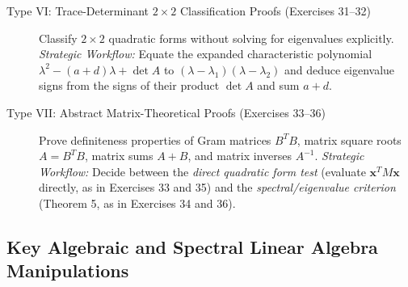 \documentclass[11pt, letterpaper]{article}
\theoremstyle{definition}
\theoremstyle{remark}
\begin{document}
\begin{description}
    \item[Type VI: Trace-Determinant $2 \times 2$ Classification Proofs (Exercises 31--32)]
    Classify $2 \times 2$ quadratic forms without solving for eigenvalues explicitly. \emph{Strategic Workflow:} Equate the expanded characteristic polynomial $\lambda^2 - (a+d)\lambda + \det A$ to $(\lambda - \lambda_1)(\lambda - \lambda_2)$ and deduce eigenvalue signs from the signs of their product $\det A$ and sum $a+d$.

    \item[Type VII: Abstract Matrix-Theoretical Proofs (Exercises 33--36)]
    Prove definiteness properties of Gram matrices $B^T B$, matrix square roots $A = B^T B$, matrix sums $A + B$, and matrix inverses $A^{-1}$. \emph{Strategic Workflow:} Decide between the \emph{direct quadratic form test} (evaluate $\mathbf{x}^T M \mathbf{x}$ directly, as in Exercises 33 and 35) and the \emph{spectral/eigenvalue criterion} (Theorem 5, as in Exercises 34 and 36).
\end{description}

\subsection{Key Algebraic and Spectral Linear Algebra Manipulations}
\end{document}
